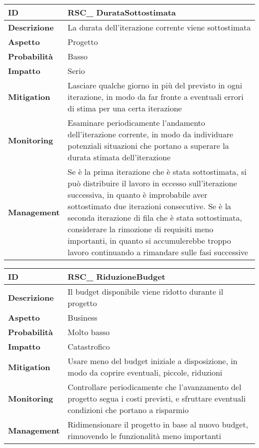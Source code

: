 \begin{tabular}{|p{2.2cm}|p{9.6cm}| }
 	\hline
	\textbf{ID} & RSC\_ DurataSottostimata\\ [0.5ex] 
	\hline
	\textbf{Descrizione} & La durata dell'iterazione corrente viene sottostimata \\ 
	\hline
	\textbf{Aspetto} &  Progetto \\
	\hline
	\textbf{Probabilità} & Basso\\ 
	\hline
	\textbf{Impatto} & Serio\\
	\hline
	\textbf{Mitigation} & Lasciare qualche giorno in più del previsto in ogni iterazione, in modo da far fronte a eventuali errori di stima per una certa iterazione\\ 
	\hline
	\textbf{Monitoring} & Esaminare periodicamente l'andamento dell'iterazione corrente, in modo da individuare potenziali situazioni che portano a superare la durata stimata dell'iterazione\\ 
	\hline
	\textbf{Management} & Se è la prima iterazione che è stata sottostimata, si può distribuire il lavoro in eccesso sull'iterazione successiva, in quanto è improbabile aver sottostimato due iterazioni consecutive. Se è la seconda iterazione di fila che è stata sottostimata, considerare la rimozione di requisiti meno importanti, in quanto si accumulerebbe troppo lavoro continuando a rimandare sulle fasi successive \\ 
	\hline
\end{tabular}


\begin{tabular}{|p{2.2cm}|p{9.6cm}| }
 	\hline
	\textbf{ID} & RSC\_ RiduzioneBudget\\ [0.5ex] 
	\hline
	\textbf{Descrizione} & Il budget disponibile viene ridotto durante il progetto\\ 
	\hline
	\textbf{Aspetto} &  Business\\
	\hline
	\textbf{Probabilità} & Molto basso\\ 
	\hline
	\textbf{Impatto} & Catastrofico\\
	\hline
	\textbf{Mitigation} & Usare meno del budget iniziale a disposizione, in modo da coprire eventuali, piccole, riduzioni\\
	\hline
	\textbf{Monitoring} & Controllare periodicamente che l'avanzamento del progetto segua i costi previsti, e sfruttare eventuali condizioni che portano a risparmio\\ 
	\hline
	\textbf{Management} & Ridimensionare il progetto in base al nuovo budget, rimuovendo le funzionalità meno importanti\\ 
	\hline
\end{tabular}

